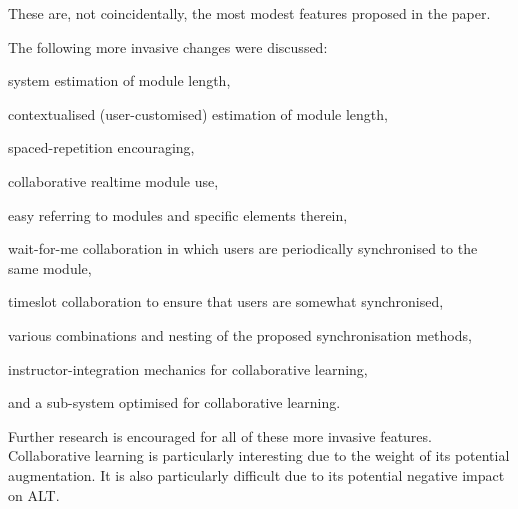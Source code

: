 \documentclass{article}
\begin{document}
\begin{multicols}{2}
These are, not coincidentally, the most modest features proposed in the paper.

The following more invasive changes were discussed:

\begin{itemize*}
  \item system estimation of module length,
  \item contextualised (user-customised) estimation of module length,
  \item spaced-repetition encouraging,
  \item collaborative realtime module use,
  \item easy referring to modules and specific elements therein,
  \item wait-for-me collaboration in which users are periodically synchronised 
  to the same module,
  \item timeslot collaboration to ensure that users are somewhat synchronised,
  \item various combinations and nesting of the proposed synchronisation 
  methods,
  \item instructor-integration mechanics for collaborative learning,
  \item and a sub-system optimised for collaborative learning.
\end{itemize*}

Further research is encouraged for all of these more invasive features. 
Collaborative learning is particularly interesting due to the weight of its 
potential augmentation. It is also particularly difficult due to its potential 
negative impact on ALT.
  \end{multicols}


\newpage
\end{document}
